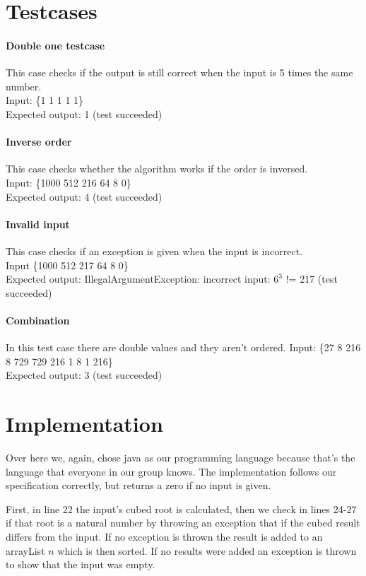 \documentclass[12pt]{article}
\begin{document}
\section{Testcases}

\paragraph{Double one testcase}
This case checks if the output is still correct when the input is 5 times the same number. \\
Input: \{1 1 1 1 1\} \\
Expected output: 1 (test succeeded)

\paragraph{Inverse order}
This case checks whether the algorithm works if the order is inversed. \\
Input: \{1000 512 216 64 8 0\} \\
Expected output: 4 (test succeeded)

\paragraph{Invalid input}
This case checks if an exception is given when the input is incorrect. \\
Input \{1000 512 217 64 8 0\} \\
Expected output: IllegalArgumentException: incorrect input: $6^3$ != 217 (test succeeded)

\paragraph{Combination}
In this test case there are double values and they aren't ordered.
Input: \{27 8 216 8 729 729 216 1 8 1 216\} \\
Expected output: 3 (test succeeded)

\section{Implementation}
Over here we, again, chose java as our programming language because that's the language that everyone in our group knows. The implementation follows our specification correctly, but returns a zero if no input is given.

First, in line 22 the input's cubed root is calculated, then we check in lines 24-27 if that root is a natural number by throwing an exception that if the cubed result differs from the input. If no exception is thrown the result is added to an arrayList $n$ which is then sorted. If no results were added an exception is thrown to show that the input was empty.
\end{document}
